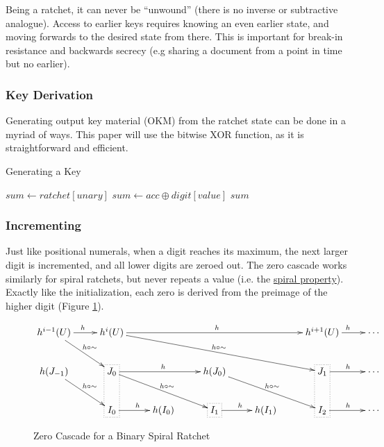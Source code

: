 \documentclass{article}
\begin{document}
	Being a ratchet, it can never be ``unwound'' (there is no inverse or subtractive analogue). Access to earlier keys requires knowing an even earlier state, and moving forwards to the desired state from there. This is important for break-in resistance and backwards secrecy (e.g sharing a document from a point in time but no earlier).

	\subsubsection{Key Derivation}

	Generating output key material (OKM) from the ratchet state can be done in a myriad of ways. This paper will use the bitwise XOR function, as it is straightforward and efficient.

	\begin{algorithm}
		\caption{Generating a Key}
		\label{alg:toKey}

		\begin{algorithmic}[1]
				\State $sum \gets ratchet[unary]$
					\State $sum \gets acc \oplus digit[value]$
				\EndFor
				\State $sum$
			\EndFunction
		\end{algorithmic}
	\end{algorithm}

	\FloatBarrier
	
	\subsubsection{Incrementing}
	
	Just like positional numerals, when a digit reaches its maximum, the next larger digit is incremented, and all lower digits are zeroed out. The zero cascade works similarly for spiral ratchets, but never repeats a value (i.e. the \hyperref[{spiral-metaphor}]{spiral property}). Exactly like the initialization, each zero is derived from the preimage of the higher digit (Figure \ref{fig:zero-cascade}).
	
	\begin{figure}[h]
		\centering
		
		$\xymatrix{
		  h^{i-1}(U)
					\ar[r]^{h}
					\ar[dr]^{h \circ \sim}
				& h^{i}(U)
					\ar[rrrr]^{h}
					\ar[drrrr]^{h \circ \sim}
				&
				&
				&
				& h^{i + 1}(U)
					\ar[r]^{h}
				& \cdots
			\\    h(J_{-1})
					\ar[dr]^{h \circ \sim}
				& J_{0}
					\ar[rr]^{h}
					\ar[drr]^{h \circ \sim}
				&
				& h(J_{0})
					\ar[drr]^{h \circ \sim}
				&
				& J_{1}
					\ar[r]^{h}
				& \cdots
			\\  
				& I_{0}
					\ar[r]^{h}
				& h(I_{0})
				& I_{1}
					\ar[r]^{h}
				& h(I_{1})
				& I_{2}
					\ar[r]^{h}
				& \cdots
			\save
			"2,2" . "3,2" *[F.] \frm{}
			\restore
			\save
			"3,4" . "3,4" *[F.] \frm{}
			\restore
			\save
			"2,6" . "3,6" *[F.] \frm{}
			\restore
		}$
		
		\caption{Zero Cascade for a Binary Spiral Ratchet}
		\label{fig:zero-cascade}
	\end{figure}
	
\end{document}
